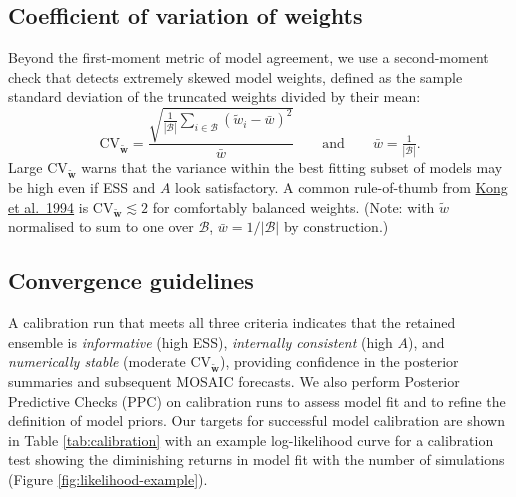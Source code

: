 \documentclass[
]{book}
\begin{document}
\subsection{Coefficient of variation of weights}\label{coefficient-of-variation-of-weights}

Beyond the first-moment metric of model agreement, we use a second-moment check that detects extremely skewed model weights, defined as the sample standard deviation of the truncated weights divided by their mean:
\begin{equation}
\mathrm{CV}_\mathbf{\tilde{w}} =
\frac{\sqrt{\tfrac{1}{|\mathcal B|}\sum_{i\in\mathcal B}\left(\tilde{w}_i-\bar w\right)^2}}
{\bar w}
\qquad \text{and} \qquad
\bar w=\tfrac1{|\mathcal B|}.
\label{eq:cvw}
\end{equation}
Large \(\mathrm{CV}_\mathbf{\tilde{w}}\) warns that the variance within the best fitting subset of models may be high even if ESS and \(A\) look satisfactory. A common rule-of-thumb from \href{https://doi.org/10.1080/01621459.1994.10476469}{Kong et al.~1994} is \(\mathrm{CV}_\mathbf{\tilde{w}}\!\lesssim\!2\) for comfortably balanced weights. (Note: with \(\tilde w\) normalised to sum to one over \(\mathcal B\), \(\bar w = 1/|\mathcal B|\) by construction.)

\subsection{Convergence guidelines}\label{convergence-guidelines}

A calibration run that meets all three criteria indicates that the retained ensemble is \emph{informative} (high ESS), \emph{internally consistent} (high \(A\)), and \emph{numerically stable} (moderate \(\mathrm{CV}_\mathbf{\tilde{w}}\)), providing confidence in the posterior summaries and subsequent MOSAIC forecasts. We also perform Posterior Predictive Checks (PPC) on calibration runs to assess model fit and to refine the definition of model priors. Our targets for successful model calibration are shown in Table \ref{tab:calibration} with an example log-likelihood curve for a calibration test showing the diminishing returns in model fit with the number of simulations (Figure \ref{fig:likelihood-example}).
\end{document}
